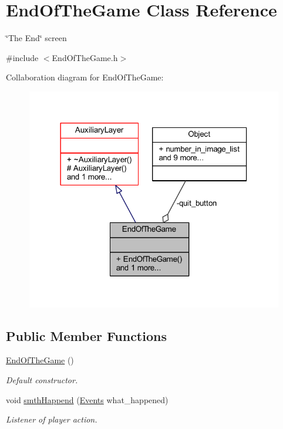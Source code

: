 \hypertarget{class_end_of_the_game}{}\section{End\+Of\+The\+Game Class Reference}
\label{class_end_of_the_game}


\char`\"{}\+The End\char`\"{} screen  




{\ttfamily \#include $<$End\+Of\+The\+Game.\+h$>$}



Collaboration diagram for End\+Of\+The\+Game\+:
\nopagebreak
\begin{figure}[H]
\begin{center}
\leavevmode
\includegraphics[width=318pt]{class_end_of_the_game__coll__graph}
\end{center}
\end{figure}
\subsection*{Public Member Functions}
\begin{DoxyCompactItemize}
\item 
\mbox{\label{class_end_of_the_game_a27eaa843d569afd8565ed6369ea82e4f}} 
\hyperlink{class_end_of_the_game_a27eaa843d569afd8565ed6369ea82e4f}{End\+Of\+The\+Game} ()
\begin{DoxyCompactList}\small\item\em Default constructor. \end{DoxyCompactList}\item 
void \hyperlink{class_end_of_the_game_a88ac00a6aaa5193c7642d9ea2c6be688}{smth\+Happend} (\hyperlink{_events_8h_af60e00b78607064c5be6aa9397ea49c1}{Events} what\+\_\+happened)
\begin{DoxyCompactList}\small\item\em Listener of player action. \end{DoxyCompactList}\end{DoxyCompactItemize}
